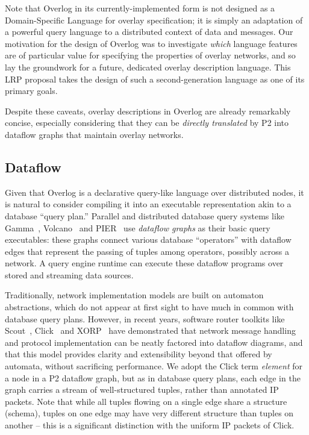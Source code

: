 \documentclass[twocolumn,10pt]{article}
\def\Sys{P2\xspace}
\def\Lang{Overlog\xspace}
\begin{document}
Note that \Lang in its currently-implemented form is not designed as a
Domain-Specific Language for 
overlay specification; it is simply an adaptation of a powerful query
language to a distributed context of data and messages.  Our 
motivation for the design of \Lang was to investigate \emph{which}
language features are of particular value for specifying the
properties of overlay networks, and so lay the groundwork for a
future, dedicated overlay description language.  This LRP proposal
takes the design of such a second-generation language as one of its
primary goals. 

Despite these caveats, overlay descriptions in \Lang are already
remarkably 
concise, especially considering that they can be \textit{directly
translated} by \Sys into dataflow graphs that maintain overlay
networks.

\subsection{Dataflow}
Given that \Lang is a declarative query-like language over distributed
nodes, it is natural to consider compiling it into an executable
representation akin to a database ``query plan.''  Parallel
and distributed database query systems like Gamma~\cite{gamma}, 
Volcano~\cite{graefe-sigmod90} and PIER~\cite{pier-cidr} use {\em
dataflow graphs} 
as their basic query executables: these graphs connect various
database ``operators'' with dataflow edges that represent the passing
of tuples among operators, possibly across a network.  A query engine
runtime can execute these dataflow programs over stored and streaming
data sources.

Traditionally, network implementation models are
built on automaton abstractions, which do not appear at first sight to
have much in common with database query plans.  However, in recent
years, software router 
toolkits like Scout~\cite{scout}, Click~\cite{click-tocs} and
XORP~\cite{handley05xorp} have demonstrated that network message handling and
protocol implementation can be neatly factored into dataflow diagrams,
and that this model provides clarity and extensibility beyond that
offered by automata, without sacrificing performance. 
We adopt the Click term \textit{element} for a node in a \Sys
dataflow graph, but as in database query plans, each edge in the graph
carries a stream of well-structured tuples, rather than annotated IP
packets.  Note that while all tuples flowing on a single edge share a structure
(schema), tuples on one edge may have very different structure than
tuples on another -- this is a significant distinction with the
uniform IP packets of Click.
\end{document}
